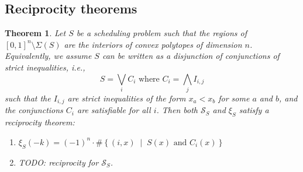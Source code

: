 \documentclass[12pt,reqno]{amsart}
\numberwithin{definition}{section}
\newtheorem{theorem}[definition]{Theorem}
\theoremstyle{definition}
\newcommand{\SSS}{\mathcal{S}}
\newcommand{\mset}[2]{ \left\{ #1 \; \middle| \; #2 \right\}}
\begin{document}
\subsection{Reciprocity theorems}

\begin{theorem}\label{posets}
Let $S$ be a scheduling problem such that the regions of $[0,1]^n\setminus\Sigma(S)$ are the interiors of convex polytopes of dimension $n$. Equivalently, we assume $S$ can be written as a disjunction of conjunctions of strict inequalities, i.e.,
\[
  S = \bigvee_i C_i \text{ where } C_i = \bigwedge_j I_{i,j}
\] 
such that the $I_{i,j}$ are strict inequalities of the form $x_a < x_b$ for some $a$ and $b$, and the conjunctions $C_i$ are satisfiable for all $i$. Then both $\SSS_S$ and $\xi_S$ satisfy a reciprocity theorem:
\begin{enumerate}
\item $\xi_S(-k) = (-1)^n\cdot \#\mset{(i,x)}{S(x) \text{ and } C_i(x)}$
\item TODO: reciprocity for $\SSS_S$.
\end{enumerate}
\end{theorem}


\end{document}
